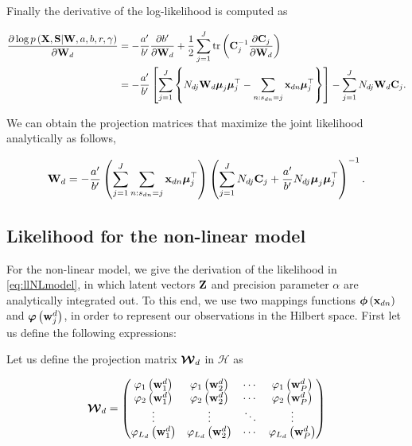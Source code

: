 	Finally the derivative of the log-likelihood is computed as
	
	\begin{align}
	\frac{\partial \log p\left(\mathbf{X},\mathbf{S}|\WIn,a,b,r,\gamma\right)}{\partial\projMatI}  &=  -\frac{a'}{b'}\frac{\partial b'}{\dWjIn}+\frac{1}{2}\sum_{j=1}^{J} \operatorname{tr}\left(\Cin^{-1}\frac{\partial \Cin}{\dWjIn}\right) \notag \\
	&=  -\frac{a'}{b'}\left[\sum_{j=1}^{J}\left\{N_{dj}\projMatI\muJ\muJ^\top - \sum_{n:s_{dn}=j}\indobj \muJ^\top\right\}\right] -\sum_{j=1}^{J}N_{dj}\projMatI\Cin.
	\end{align}
	
	We can obtain the projection matrices that maximize the joint likelihood analytically as follows,
	
	\begin{align}
	\projMatI =  -\frac{a'}{b'}\left(\sum_{j=1}^{J}{\sum_{n:s_{dn}=j}\indobj \muJ^\top}\right)\left(\sum_{j=1}^{J}{N_{dj}\Cin+\frac{a'}{b'}N_{dj}\muJ\muJ^\top} \right)^{-1}.
	\end{align}
	
	\subsection{Likelihood for the non-linear model}
	
	For the non-linear model, we give the derivation of the likelihood in \eqref{eq:llNLmodel}, in which latent vectors $\Z$ and precision parameter $\alpha$ are analytically integrated out. To this end, we use two mappings functions $\phixnd$ and $\phiwld{j}$, in order to represent our observations in the Hilbert space. First let us define the following expressions:
	
	Let us define the projection matrix $\projMat$ in $\mathcal{H}$ as
	
	\begin{align}
	\projMat =
	\left(\begin{matrix}
	\phiwldI{1}{1} & \phiwldI{2}{1} & \cdots& \phiwldI{P}{1}  \\
	\phiwldI{1}{2} & \phiwldI{2}{2} &\cdots& \phiwldI{P}{2}  \\
	\vdots  & \vdots  & \ddots & \vdots  \\
	\phiwldI{1}{L_d} & \phiwldI{2}{L_d} &\cdots& \phiwldI{P}{L_d}
	\end{matrix} \right)
	\end{align}
	
